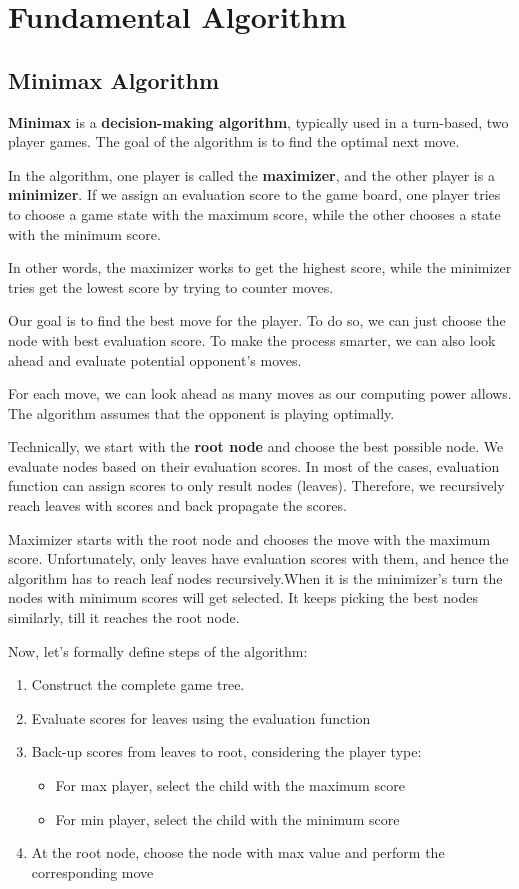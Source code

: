 \documentclass[11pt]{article}
\begin{document}
\pagebreak

\section{Fundamental Algorithm}
\subsection{Minimax Algorithm}
\textbf{Minimax} is a \textbf{decision-making algorithm}, typically used in a turn-based, two player games. The goal of the algorithm is to find the optimal next move.

In the algorithm, one player is called the \textbf{maximizer}, and the other player is a \textbf{minimizer}. If we assign an evaluation score to the game board, one player tries to choose a game state with the maximum score, while the other chooses a state with the minimum score.

In other words, the maximizer works to get the highest score, while the minimizer tries get the lowest score by trying to counter moves.

Our goal is to find the best move for the player. To do so, we can just choose the node with best evaluation score. To make the process smarter, we can also look ahead and evaluate potential opponent’s moves.

For each move, we can look ahead as many moves as our computing power allows. The algorithm assumes that the opponent is playing optimally.

Technically, we start with the \textbf{root node} and choose the best possible node. We evaluate nodes based on their evaluation scores. In most of the cases, evaluation function can assign scores to only result nodes (leaves). Therefore, we recursively reach leaves with scores and back propagate the scores.

Maximizer starts with the root node and chooses the move with the maximum score. Unfortunately, only leaves have evaluation scores with them, and hence the algorithm has to reach leaf nodes recursively.When it is the minimizer’s turn the nodes with minimum scores will get selected. It keeps picking the best nodes similarly, till it reaches the root node.

Now, let’s formally define steps of the algorithm:
\begin{enumerate}
   \item Construct the complete game tree.
   \item Evaluate scores for leaves using the evaluation function
   \item Back-up scores from leaves to root, considering the player type:
   \begin{itemize}
     \item For max player, select the child with the maximum score
     \item For min player, select the child with the minimum score
   \end{itemize}
   \item At the root node, choose the node with max value and perform the corresponding move
\end{enumerate}
\end{document}
